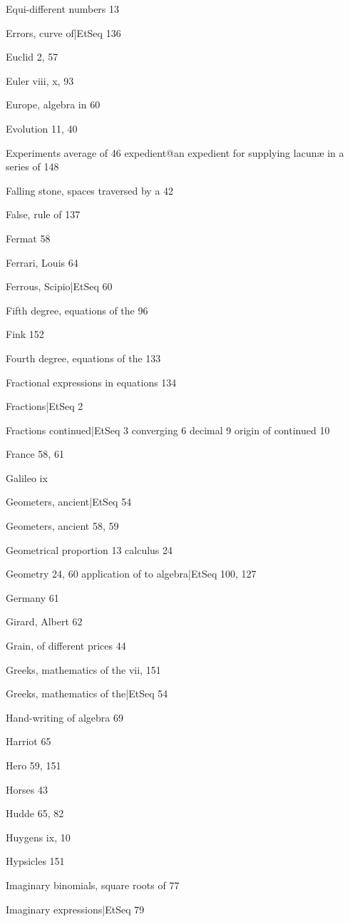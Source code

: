 \documentclass[12pt]{book}[2005/09/16]
\begin{document}
Equi-different numbers 13

Errors, curve of|EtSeq 136 %

Euclid 2, 57

Euler viii, x, 93

Europe, algebra in 60

Evolution 11, 40

Experiments
  average of 46
  expedient@an expedient for supplying lacunæ in a series of 148

Falling stone, spaces traversed by a 42

False, rule of 137

Fermat 58

Ferrari, Louis 64

Ferrous, Scipio|EtSeq 60 %

Fifth degree, equations of the 96

Fink 152

Fourth degree, equations of the 133

Fractional expressions in equations 134

Fractions|EtSeq 2 %

Fractions
  continued|EtSeq 3 %
  converging 6
  decimal 9
  origin of continued 10

France 58, 61

Galileo ix

Geometers, ancient|EtSeq 54 %

Geometers, ancient 58, 59

Geometrical
  proportion 13
  calculus 24

Geometry 24, 60
  application of to algebra|EtSeq 100, 127 %

Germany 61

Girard, Albert 62

Grain, of different prices 44

Greeks, mathematics of the vii, 151

Greeks, mathematics of the|EtSeq 54 %

Hand-writing of algebra 69

Harriot 65

Hero 59, 151

Horses 43

Hudde 65, 82

Huygens ix, 10

Hypsicles 151

Imaginary binomials, square roots of 77

Imaginary expressions|EtSeq 79 %
\end{document}
